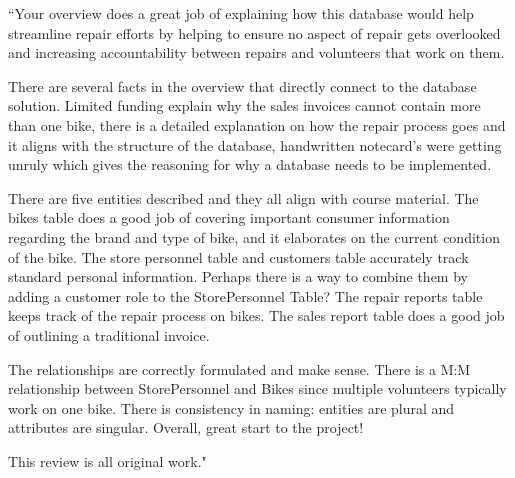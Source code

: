 \documentclass{article}
\begin{document}
\begin{tcolorbox}[colback=secondarycolor, colframe=primarycolor, title=\textbf{Step 1: Peer Review 1 - Tyler Grzymalski}]
``Your overview does a great job of explaining how this database would help streamline repair efforts by helping to ensure no aspect of repair gets overlooked and increasing accountability between repairs and volunteers that work on them.

\vspace{0.2cm}

There are several facts in the overview that directly connect to the database solution. Limited funding explain why the sales invoices cannot contain more than one bike, there is a detailed explanation on how the repair process goes and it aligns with the structure of the database, handwritten notecard's were getting unruly which gives the reasoning for why a database needs to be implemented.

\vspace{0.2cm}

There are five entities described and they all align with course material. The bikes table does a good job of covering important consumer information regarding the brand and type of bike, and it elaborates on the current condition of the bike. The store personnel table and customers table accurately track standard personal information. Perhaps there is a way to combine them by adding a customer role to the StorePersonnel Table? The repair reports table keeps track of the repair process on bikes. The sales report table does a good job of outlining a traditional invoice.

\vspace{0.2cm}

The relationships are correctly formulated and make sense. There is a M:M relationship between StorePersonnel and Bikes since multiple volunteers typically work on one bike. There is consistency in naming: entities are plural and attributes are singular. Overall, great start to the project!

\vspace{0.2cm}

This review is all original work."
\vspace{0.2cm}
\end{tcolorbox}
\end{document}
